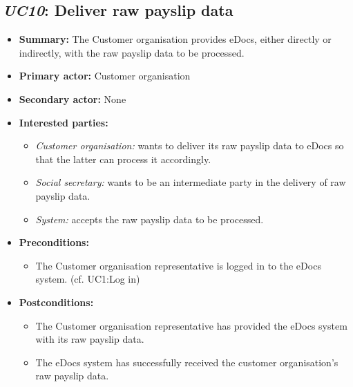 \documentclass[a4paper,10pt]{article}
\begin{document}
\subsection{\emph{UC10}: Deliver raw payslip data}
\label{usecase:deliverrawpayslipdata}
\begin{itemize}
    \item \textbf{Summary:} The Customer organisation provides eDocs, either directly or indirectly, with the raw payslip data to be processed.
    \item \textbf{Primary actor:} Customer organisation
    \item \textbf{Secondary actor:} None
    \item \textbf{Interested parties:} 
        \begin{itemize}
            \item \textit{Customer organisation:} wants to deliver its raw payslip data to eDocs so that the latter can process it accordingly.
            \item \textit{Social secretary:} wants to be an intermediate party in the delivery of raw payslip data.
            \item \textit{System:} accepts the raw payslip data to be processed.
        \end{itemize}
    \item \textbf{Preconditions:}
        \begin{itemize}
            \item The Customer organisation representative is logged in to the eDocs system. (cf. UC1:Log in)
        \end{itemize}
    \item \textbf{Postconditions:}
        \begin{itemize}
            \item The Customer organisation representative has provided the eDocs system with its raw payslip data.
            \item The eDocs system has successfully received the customer organisation's raw payslip data.
        \end{itemize}
        

\end{itemize}
\end{document}
